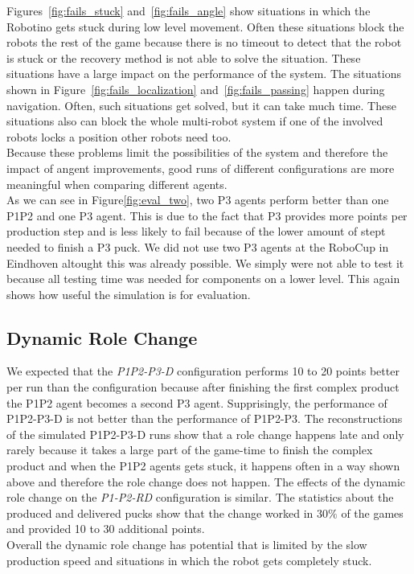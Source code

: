 Figures~\ref{fig:fails_stuck} and~\ref{fig:fails_angle} show situations in which the Robotino gets stuck during low level movement. Often these situations block the robots the rest of the game because there is no timeout to detect that the robot is stuck or the recovery method is not able to solve the situation. These situations have a large impact on the performance of the system. The situations shown in Figure~\ref{fig:fails_localization} and~\ref{fig:fails_passing} happen during navigation. Often, such situations get solved, but it can take much time. These situations also can block the whole multi-robot system if one of the involved robots locks a position other robots need too.\\
Because these problems limit the possibilities of the system and therefore the impact of angent improvements, good runs of different configurations are more meaningful when comparing different agents.\\
As we can see in Figure\ref{fig:eval_two}, two P3 agents perform better than one P1P2 and one P3 agent. This is due to the fact that P3 provides more points per production step and is less likely to fail because of the lower amount of stept needed to finish a P3 puck. We did not use two P3 agents at the RoboCup in Eindhoven altought this was already possible. We simply were not able to test it because all testing time was needed for components on a lower level. This again shows how useful the simulation is for evaluation.

\subsection{Dynamic Role Change}
We expected that the \textit{P1P2-P3-D} configuration performs 10 to 20 points better per run than the  configuration because after finishing the first complex product the P1P2 agent becomes a second P3 agent. Supprisingly, the performance of P1P2-P3-D is not better than the performance of P1P2-P3. The reconstructions of the simulated P1P2-P3-D runs show that a role change happens late and only rarely because it takes a large part of the game-time to finish the complex product and when the P1P2 agents gets stuck, it happens often in a way shown above and therefore the role change does not happen. The effects of the dynamic role change on the \textit{P1-P2-RD} configuration is similar. The statistics about the produced and delivered pucks show that the change worked in $30\%$ of the games and provided 10 to 30 additional points.\\
Overall the dynamic role change has potential that is limited by the slow production speed and situations in which the robot gets completely stuck.

